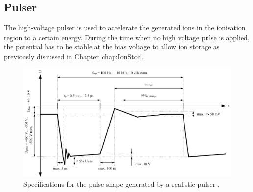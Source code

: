 	\subsection{Pulser }
	The high-voltage pulser is used to accelerate the generated ions in the ionisation region to a certain energy. During the time when no high voltage pulse is applied, the potential has to be stable at the bias voltage to allow ion storage as previously discussed in Chapter\,\ref{chap:IonStor}.\\
	\begin{figure}[h]
		\centering
		\includegraphics[width=\textwidth]{Bilder/Pulser_theretical_shape.jpg}
		\caption{Specifications for the pulse shape generated by a realistic pulser \cite{Diss_Meyer}.}
		\label{fig:PulserTheoCurve}
	\end{figure}
